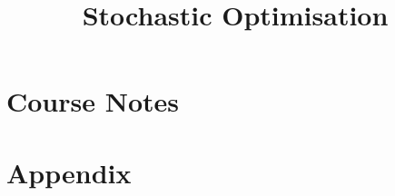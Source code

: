 \documentclass[nocolor]{report}
\title{Stochastic Optimisation}
\begin{document}
    \maketitle
    \tableofcontents
    \newpage
    \chapter{Course Notes}
    
    \newpage
    
    
    \chapter{Appendix}
    

    
\end{document}

